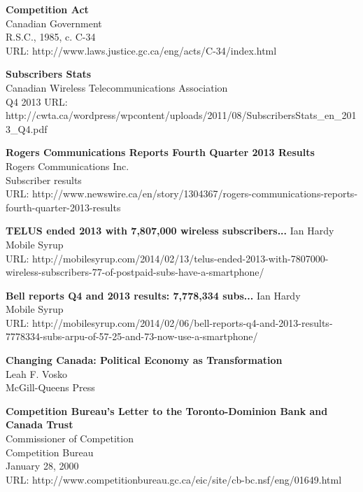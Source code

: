 \documentclass[12pt]{article}
\newcommand\bold[1]{\textbf{#1}}
\begin{document}
\begin{thebibliography}{1}

\bold{Competition Act}\\
Canadian Government\\
R.S.C., 1985, c. C-34\\
URL: http://www.laws.justice.gc.ca/eng/acts/C-34/index.html

\bold{Subscribers Stats}\\
Canadian Wireless Telecommunications Association\\
Q4 2013
URL: http://cwta.ca/wordpress/wp\-content/uploads/2011/08/SubscribersStats\_en\_2013\_Q4.pdf

\bold{Rogers Communications Reports Fourth Quarter 2013 Results}\\
Rogers Communications Inc.\\
Subscriber results\\
URL: http://www.newswire.ca/en/story/1304367/rogers-communications-reports-fourth-quarter-2013-results

\bold{TELUS ended 2013 with 7,807,000 wireless subscribers...}
Ian Hardy\\
Mobile Syrup\\
URL: http://mobilesyrup.com/2014/02/13/telus-ended-2013-with-7807000-wireless-subscribers-77-of-postpaid-subs-have-a-smartphone/

\bold{Bell reports Q4 and 2013 results: 7,778,334 subs...}
Ian Hardy\\
Mobile Syrup\\
URL: http://mobilesyrup.com/2014/02/06/bell-reports-q4-and-2013-results-7778334-subs-arpu-of-57-25-and-73-now-use-a-smartphone/

\bold{Changing Canada: Political Economy as Transformation}\\
Leah F. Vosko\\
McGill-Queens Press

\bold{ Competition Bureau's Letter to the Toronto-Dominion Bank and Canada Trust}\\
Commissioner of Competition\\
Competition Bureau\\
January 28, 2000\\
URL: http://www.competitionbureau.gc.ca/eic/site/cb-bc.nsf/eng/01649.html
  \end{thebibliography}
\end{document}
